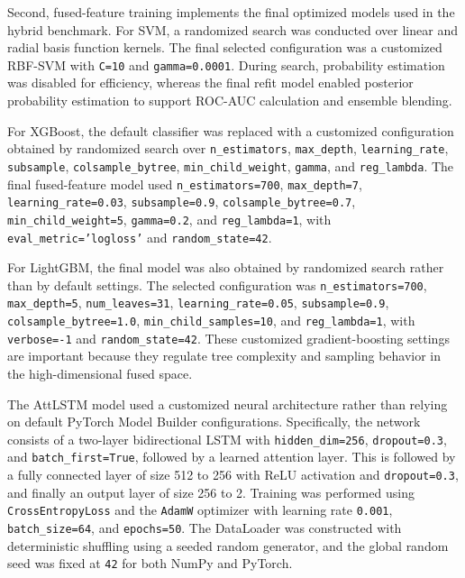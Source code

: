 \documentclass[11pt]{article}
\begin{document}
Second, fused-feature training implements the final optimized models used in the hybrid benchmark. For SVM, a randomized search was conducted over linear and radial basis function kernels. The final selected configuration was a customized RBF-SVM with \texttt{C=10} and \texttt{gamma=0.0001}. During search, probability estimation was disabled for efficiency, whereas the final refit model enabled posterior probability estimation to support ROC-AUC calculation and ensemble blending.

For XGBoost, the default classifier was replaced with a customized configuration obtained by randomized search over \texttt{n\_estimators}, \texttt{max\_depth}, \texttt{learning\_rate}, \texttt{subsample}, \texttt{colsample\_bytree}, \texttt{min\_child\_weight}, \texttt{gamma}, and \texttt{reg\_lambda}. The final fused-feature model used \texttt{n\_estimators=700}, \texttt{max\_depth=7}, \texttt{learning\_rate=0.03}, \texttt{subsample=0.9}, \texttt{colsample\_bytree=0.7}, \texttt{min\_child\_weight=5}, \texttt{gamma=0.2}, and \texttt{reg\_lambda=1}, with \texttt{eval\_metric='logloss'} and \texttt{random\_state=42}.

For LightGBM, the final model was also obtained by randomized search rather than by default settings. The selected configuration was \texttt{n\_estimators=700}, \texttt{max\_depth=5}, \texttt{num\_leaves=31}, \texttt{learning\_rate=0.05}, \texttt{subsample=0.9}, \texttt{colsample\_bytree=1.0}, \texttt{min\_child\_samples=10}, and \texttt{reg\_lambda=1}, with \texttt{verbose=-1} and \texttt{random\_state=42}. These customized gradient-boosting settings are important because they regulate tree complexity and sampling behavior in the high-dimensional fused space.

The AttLSTM model used a customized neural architecture rather than relying on default PyTorch Model Builder configurations. Specifically, the network consists of a two-layer bidirectional LSTM with \texttt{hidden\_dim=256}, \texttt{dropout=0.3}, and \texttt{batch\_first=True}, followed by a learned attention layer. This is followed by a fully connected layer of size 512 to 256 with ReLU activation and \texttt{dropout=0.3}, and finally an output layer of size 256 to 2. Training was performed using \texttt{CrossEntropyLoss} and the \texttt{AdamW} optimizer with learning rate \texttt{0.001}, \texttt{batch\_size=64}, and \texttt{epochs=50}. The DataLoader was constructed with deterministic shuffling using a seeded random generator, and the global random seed was fixed at \texttt{42} for both NumPy and PyTorch.
\end{document}
